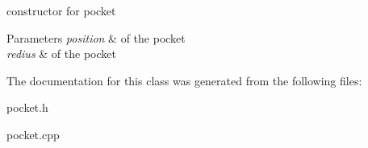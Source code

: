 constructor for pocket 


\begin{DoxyParams}{Parameters}
{\em position} & of the pocket \\
\hline
{\em redius} & of the pocket \\
\hline
\end{DoxyParams}


The documentation for this class was generated from the following files\+:\begin{DoxyCompactItemize}
\item 
pocket.\+h\item 
pocket.\+cpp\end{DoxyCompactItemize}
